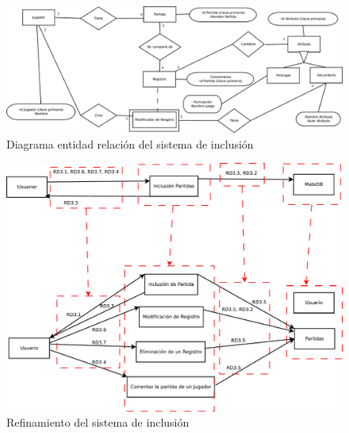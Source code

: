 
\begin{figure}[h!]
	\centering
	\includegraphics[width=0.7\linewidth]{../Diagramas/pdf/ER-Inclusion.pdf}
	\caption{Diagrama entidad relación del sistema de inclusión}
	\label{fig:ER}
\end{figure}



\begin{figure}[h!]
\centering
\includegraphics[width=0.7\linewidth]{../Diagramas/pdf/RefinamientoInclusion.pdf}
\caption{Refinamiento del sistema de inclusión}
\label{fig:RefinamientoInclusion}
\end{figure}
